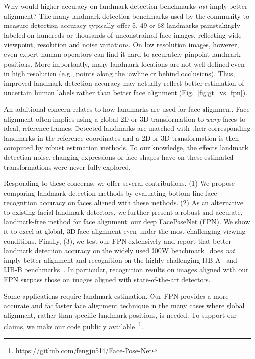 \documentclass[10pt,twocolumn,letterpaper]{article}
\begin{document}

Why would higher accuracy on landmark detection benchmarks {\em not} imply better alignment? The many landmark detection benchmarks used by the community to measure detection accuracy typically offer 5, 49 or 68 landmarks painstakingly labeled on hundreds or thousands of unconstrained face images, reflecting wide viewpoint, resolution and noise variations. On low resolution images, however, even expert human operators can find it hard to accurately pinpoint landmark positions. More importantly, many landmark locations are not well defined even in high resolution (e.g., points along the jawline or behind occlusions). Thus, improved landmark detection accuracy may actually reflect better estimation of uncertain human labels rather than better face alignment (Fig.~\ref{fig:gt_vs_fpn}).




An additional concern relates to how landmarks are used for face alignment. Face alignment often implies using a global 2D or 3D transformation to {\em warp} faces to ideal, reference frames: Detected landmarks are matched with their corresponding landmarks in the reference coordinates and a 2D or 3D transformation is then computed by robust estimation methods. To our knowledge, the effects landmark detection noise, changing expressions or face shapes have on these estimated transformations were never fully explored. 

Responding to these concerns, we offer several contributions. (1) We propose comparing landmark detection methods by evaluating bottom line face recognition accuracy on faces aligned with these methods. (2) As an alternative to existing facial landmark detectors, we further present a robust and accurate, landmark-free method for face alignment: our deep FacePoseNet (FPN). We show it to excel at global, 3D face alignment even under the most challenging viewing conditions. Finally, (3), we test our FPN extensively and report that better landmark detection accuracy on the widely used 300W benchmark~\cite{sagonas2015300} does {\em not} imply better alignment and recognition on the highly challenging IJB-A~\cite{Klare_2015_CVPR} and IJB-B benchmarks~\cite{whitelam2017iarpa}. In particular, recognition results on images aligned with our FPN surpass those on images aligned with state-of-the-art detectors.  

Some applications require landmark estimation. Our FPN provides a more accurate and far faster face alignment technique in the many cases where global alignment, rather than specific landmark positions, is needed. To support our claims, we make our code publicly available~\footnote{\url{https://github.com/fengju514/Face-Pose-Net}}.
\end{document}
